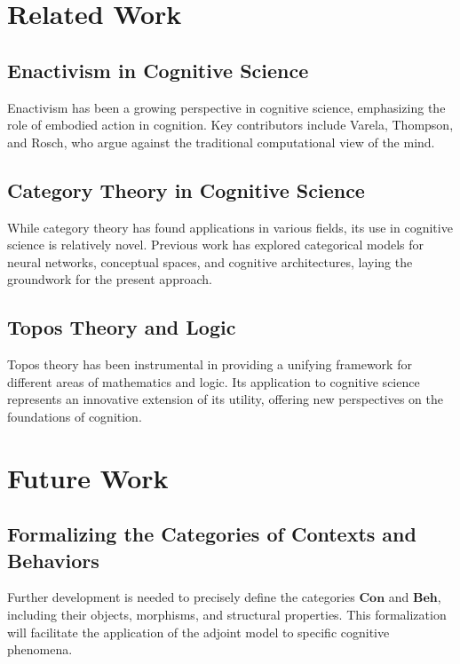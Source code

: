 \documentclass{article}
\begin{document}
\section{Related Work}

\subsection{Enactivism in Cognitive Science}

Enactivism has been a growing perspective in cognitive science, emphasizing the role of embodied action in cognition. Key contributors include Varela, Thompson, and Rosch, who argue against the traditional computational view of the mind.

\subsection{Category Theory in Cognitive Science}

While category theory has found applications in various fields, its use in cognitive science is relatively novel. Previous work has explored categorical models for neural networks, conceptual spaces, and cognitive architectures, laying the groundwork for the present approach.

\subsection{Topos Theory and Logic}

Topos theory has been instrumental in providing a unifying framework for different areas of mathematics and logic. Its application to cognitive science represents an innovative extension of its utility, offering new perspectives on the foundations of cognition.

\section{Future Work}

\subsection{Formalizing the Categories of Contexts and Behaviors}

Further development is needed to precisely define the categories $\mathbf{Con}$ and $\mathbf{Beh}$, including their objects, morphisms, and structural properties. This formalization will facilitate the application of the adjoint model to specific cognitive phenomena.
\end{document}
